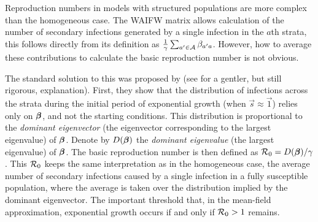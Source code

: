 \documentclass[thesis.tex]{subfiles}
\begin{document}
Reproduction numbers in models with structured populations are more complex than the homogeneous case.
The WAIFW matrix allows calculation of the number of secondary infections generated by a single infection in the $a$th strata,  this follows directly from its definition as $\frac{1}{\gamma} \sum_{a' \in \mathcal{A}} \beta_{a'a}$. 
However, how to average these contributions to calculate the basic reproduction number is not obvious.

The standard solution to this was proposed by \textcite{diekmannDefinition} (see \textcite[chapter 7]{diekmannMathematical} for a gentler, but still rigorous, explanation).
First, they show that the distribution of infections across the strata during the initial period of exponential growth (when $\vec{s} \approx \vec{1}$) relies only on $\bm{\beta}$, and not the starting conditions.
This distribution is proportional to the \emph{dominant eigenvector} (the eigenvector corresponding to the largest eigenvalue) of $\bm{\beta}$.
Denote by $D(\bm{\beta})$ the \emph{dominant eigenvalue} (the largest eigenvalue) of $\bm{\beta}$.
The basic reproduction number is then defined as $\mathcal{R}_{0} = D(\bm{\beta}) / \gamma$.
This $\mathcal{R}_{0}$ keeps the same interpretation as in the homogeneous case, \ie the average number of secondary infections caused by a single infection in a fully susceptible population, where the average is taken over the distribution implied by the dominant eigenvector.
The important threshold that, in the mean-field approximation, exponential growth occurs if and only if $\mathcal{R}_{0} > 1$ remains.
\end{document}
